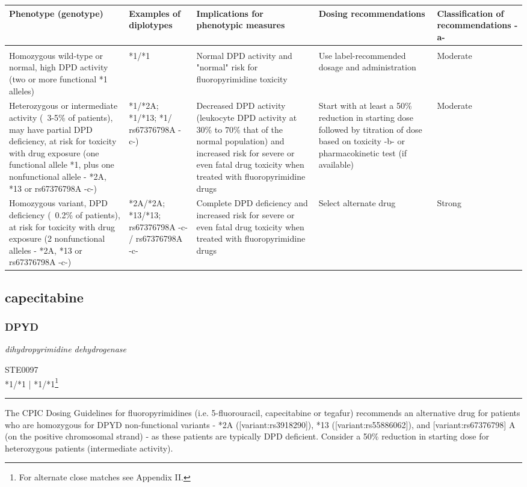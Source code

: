 \documentclass{report}
\begin{document}
      \begin{tabularx}{\textwidth}{ XXXXX }
      \textbf{ Phenotype (genotype) }&\textbf{ Examples of diplotypes }&\textbf{ Implications for phenotypic measures }&\textbf{ Dosing recommendations }&\textbf{ Classification of recommendations -a- } \\ \hline \\  Homozygous wild-type or normal, high DPD activity (two or more functional *1 alleles) & *1/*1 & Normal DPD activity and "normal" risk for fluoropyrimidine toxicity & Use label-recommended dosage and administration & Moderate  \\  Heterozygous or intermediate activity (~3-5\% of patients), may have partial DPD deficiency, at risk for toxicity with drug exposure (one functional allele *1, plus one nonfunctional allele - *2A, *13 or rs67376798A -c-) & *1/*2A; *1/*13; *1/ rs67376798A -c-) & Decreased DPD activity (leukocyte DPD activity at 30\% to 70\% that of the normal population) and increased risk for severe or even fatal drug toxicity when treated with fluoropyrimidine drugs & Start with at least a 50\% reduction in starting dose followed by titration of dose based on toxicity -b- or pharmacokinetic test (if available) & Moderate  \\  Homozygous variant, DPD deficiency (~0.2\% of patients), at risk for toxicity with drug exposure (2 nonfunctional alleles - *2A, *13 or rs67376798A -c-) & *2A/*2A; *13/*13; rs67376798A -c- / rs67376798A -c- & Complete DPD deficiency and increased risk for severe or even fatal drug toxicity when treated with fluoropyrimidine drugs & Select alternate drug & Strong  \\ 
      \end{tabularx}
      
      \normalsize





\subsection{ capecitabine }

\subsubsection{ DPYD }
     \textit{ dihydropyrimidine dehydrogenase } \begin{flushright} \textsc{ STE0097 \\ *1/*1  | *1/*1\footnote{For alternate close matches see Appendix II.} }\end{flushright}
      \hrule \vspace{6pt}
      The CPIC Dosing Guidelines for fluoropyrimidines (i.e. 5-fluorouracil, capecitabine or tegafur) recommends an alternative drug for patients who are homozygous for DPYD non-functional variants - *2A ([variant:rs3918290]), *13 ([variant:rs55886062]), and [variant:rs67376798] A (on the positive chromosomal strand) - as these patients are typically DPD deficient.  Consider a 50\% reduction in starting dose for heterozygous patients (intermediate activity). \newline
      \scriptsize
      
\end{document}
